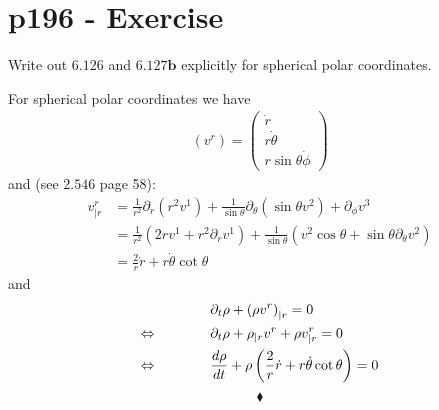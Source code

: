 \section{p196 - Exercise}
\begin{tcolorbox}
Write out $\mathbf{6.126}$ and $\mathbf{6.127b}$ explicitly for spherical polar coordinates.
\end{tcolorbox}
For spherical polar coordinates we have 
\begin{align}
(v^r) = \left(\begin{matrix}\dot{r}\\r\dot{\theta}\\r\sin\theta\dot{\phi} \end{matrix}\right)
\end{align}
and (see $\mathbf{2.546}$ page 58):
\begin{align}
v^r_{|r} &= \frac{1}{r^2}\partial_r\left(r^2v^1\right)+\frac{1}{\sin\theta}\partial_{\theta}\left(\sin\theta v^2\right)+\partial_{\phi} v^3\\
&=  \frac{1}{r^2}\left(2rv^1+r^2\partial_rv^1\right)+\frac{1}{\sin\theta}\left(v^2\cos\theta + \sin\theta\partial_{\theta}v^2\right)\\
&= \frac{2}{r}\dot{r}+r\dot{\theta}\cot \theta 
\end{align}
and 
\begin{align}
&\partial_t \rho+ \left(\rho v^r\right)_{|r} =0\\
\Leftrightarrow\quad\quad\quad\quad &\partial_t\rho+ \rho_{|r}v^r+\rho v^r_{|r} =0\\
\Leftrightarrow\quad\quad\quad\quad &\dv{\rho}{t}+\rho \left(\frac{2}{r}\dot{r}+r\dot{\theta}\cot \theta \right) =0
\end{align}
 $$\blacklozenge$$
\newpage


